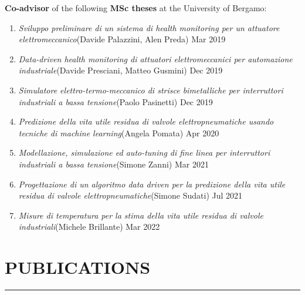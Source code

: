\documentclass[10pt]{article}
\newcommand{\cvsection}[1]{\section*{\centering\normalsize\uppercase{#1}}\vspace{-16pt}\rule{\linewidth}{0.2pt}\vspace{6pt}}
\begin{document}
\textbf{Co-advisor} of the following \textbf{MSc theses} at the University of Bergamo:
\vspace{-6pt}
\begin{enumerate}
	\setlength\itemsep{-16pt}
	\item \textit{Sviluppo preliminare di un sistema di health monitoring per un attuatore elettromeccanico}\hfill{\scriptsize (Davide Palazzini, Alen Preda)} Mar 2019\\
	\item \textit{Data-driven health monitoring di attuatori elettromeccanici per automazione industriale}\hfill{\scriptsize(Davide Presciani, Matteo Gusmini)} Dec 2019\\
	\item \textit{Simulatore elettro-termo-meccanico di strisce bimetalliche per interruttori industriali a bassa tensione}\hfill{\scriptsize(Paolo Pasinetti)} Dec 2019\\
	\item \textit{Predizione della vita utile residua di valvole elettropneumatiche usando tecniche di machine learning}\hfill{\scriptsize(Angela Pomata)} Apr 2020\\
	\item \textit{Modellazione, simulazione ed auto-tuning di fine linea per interruttori industriali a bassa tensione}\hfill{\scriptsize(Simone Zanni)} Mar 2021\\
	\item \textit{Progettazione di un algoritmo data driven
	per la predizione della vita utile residua di
	valvole elettropneumatiche}\hfill{\scriptsize(Simone Sudati)} Jul 2021\\
	\item \textit{Misure di temperatura per la stima della vita utile residua di valvole industriali}\hfill{\scriptsize(Michele Brillante)} Mar 2022\\
\end{enumerate}
\vspace{-20pt}
\cvsection{publications}
\end{document}
